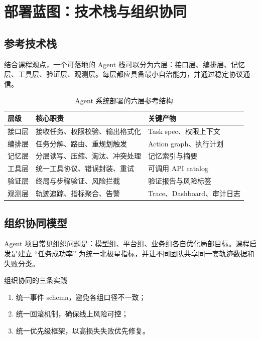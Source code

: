 \documentclass[a4paper]{article}
\begin{document}
\section{部署蓝图：技术栈与组织协同}

\subsection{参考技术栈}
结合课程观点，一个可落地的 Agent 栈可以分为六层：接口层、编排层、记忆层、工具层、验证层、观测层。每层都应具备最小自治能力，并通过稳定协议通信。

\begin{table}[H]
\centering
\begin{tabular}{p{2.4cm}p{4.0cm}p{4.6cm}}
\toprule
\textbf{层级} & \textbf{核心职责} & \textbf{关键产物} \\
\midrule
接口层 & 接收任务、权限校验、输出格式化 & Task spec、权限上下文 \\
编排层 & 任务分解、路由、重规划触发 & Action graph、执行计划 \\
记忆层 & 分层读写、压缩、淘汰、冲突处理 & 记忆索引与摘要 \\
工具层 & 统一工具协议、错误封装、重试 & 可调用 API catalog \\
验证层 & 终局与步骤验证、风险拦截 & 验证报告与风险标签 \\
观测层 & 轨迹追踪、指标聚合、告警 & Trace、Dashboard、审计日志 \\
\bottomrule
\end{tabular}
\caption{Agent 系统部署的六层参考结构}
\end{table}

\subsection{组织协同模型}
Agent 项目常见组织问题是：模型组、平台组、业务组各自优化局部目标。课程启发是建立 ``任务成功率'' 为统一北极星指标，并让不同团队共享同一套轨迹数据和失败分类。

\begin{importantbox}{组织协同的三条实践}
\begin{enumerate}
    \item 统一事件 schema，避免各组口径不一致；
    \item 统一回滚机制，确保线上风险可控；
    \item 统一优先级框架，以高损失失败优先修复。
\end{enumerate}
\end{importantbox}
\end{document}
